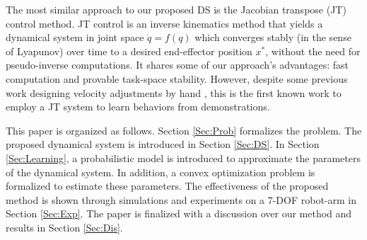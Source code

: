 \documentclass[letterpaper, 10 pt, conference,fleqn]{ieeeconf}
\begin{document}
The most similar approach to our proposed DS is the Jacobian transpose (JT) control \cite{wolovich1984computational} method. JT control is an inverse kinematics
method that yields a dynamical system in joint space $\dot{q} = f(q)$ which converges stably (in the sense of Lyapunov) over time to a desired end-effector position $x^*$, without the need for pseudo-inverse computations. It shares some of our approach's advantages: fast computation and provable task-space stability. However, despite some previous work designing velocity adjustments by hand \cite{Shi2016}, this is the first known work to employ a JT system to learn behaviors from demonstrations. 

This paper is organized as follows. Section \ref{Sec:Prob} formalizes the problem. The proposed dynamical system is introduced in Section \ref{Sec:DS}. In Section \ref{Sec:Learning}, a probabilistic model is introduced to approximate the parameters of the dynamical system. In addition, a convex optimization problem is  formalized to estimate these parameters. The effectiveness of the proposed method is shown through simulations and experiments on a 7-DOF robot-arm in Section \ref{Sec:Exp}. The paper is finalized with a discussion over our method and results in Section \ref{Sec:Dis}.

\end{document}
